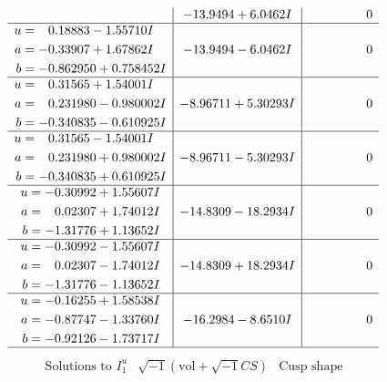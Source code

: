 \documentclass[1p]{elsarticle_modified}
\theoremstyle{definition}
\newcommand{\I}{\sqrt{-1}}
\begin{document}
$$\begin{array}{c|c|c}
 & -13.9494 + 6.0462 I & \phantom{-0.000000 } 0 \\ \hline\begin{aligned}
u &= \phantom{-}0.18883 - 1.55710 I \\
a &= -0.33907 + 1.67862 I \\
b &= -0.862950 + 0.758452 I\end{aligned}
 & -13.9494 - 6.0462 I & \phantom{-0.000000 } 0 \\ \hline\begin{aligned}
u &= \phantom{-}0.31565 + 1.54001 I \\
a &= \phantom{-}0.231980 - 0.980002 I \\
b &= -0.340835 - 0.610925 I\end{aligned}
 & -8.96711 + 5.30293 I & \phantom{-0.000000 } 0 \\ \hline\begin{aligned}
u &= \phantom{-}0.31565 - 1.54001 I \\
a &= \phantom{-}0.231980 + 0.980002 I \\
b &= -0.340835 + 0.610925 I\end{aligned}
 & -8.96711 - 5.30293 I & \phantom{-0.000000 } 0 \\ \hline\begin{aligned}
u &= -0.30992 + 1.55607 I \\
a &= \phantom{-}0.02307 + 1.74012 I \\
b &= -1.31776 + 1.13652 I\end{aligned}
 & -14.8309 - 18.2934 I & \phantom{-0.000000 } 0 \\ \hline\begin{aligned}
u &= -0.30992 - 1.55607 I \\
a &= \phantom{-}0.02307 - 1.74012 I \\
b &= -1.31776 - 1.13652 I\end{aligned}
 & -14.8309 + 18.2934 I & \phantom{-0.000000 } 0 \\ \hline\begin{aligned}
u &= -0.16255 + 1.58538 I \\
a &= -0.87747 - 1.33760 I \\
b &= -0.92126 - 1.73717 I\end{aligned}
 & -16.2984 - 8.6510 I & \phantom{-0.000000 } 0\\
 \hline 
 \end{array}$$\newpage$$\begin{array}{c|c|c}  
\text{Solutions to }I^u_{1}& \I (\text{vol} + \sqrt{-1}CS) & \text{Cusp shape}\\

\end{array}$$
\end{document}

